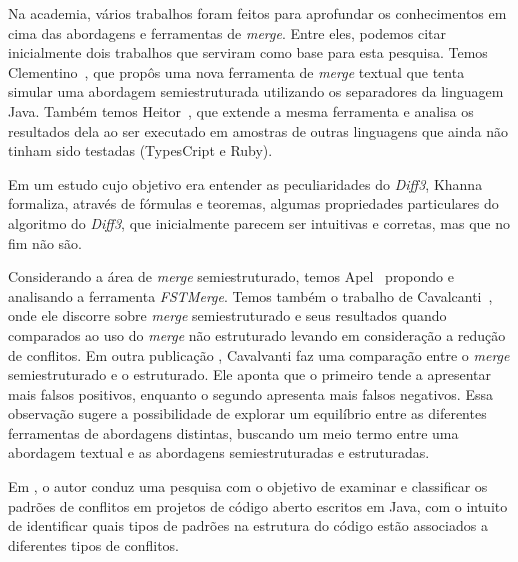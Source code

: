 Na academia, vários trabalhos foram feitos para aprofundar os conhecimentos em cima das abordagens e
ferramentas de \emph{merge}. Entre eles, podemos citar inicialmente dois trabalhos que serviram como base para esta pesquisa.
Temos Clementino~\cite{clem21}, que propôs uma nova ferramenta de \emph{merge} textual que tenta simular uma abordagem semiestruturada
utilizando os separadores da linguagem Java. Também temos Heitor~\cite{heitor21}, que extende a mesma ferramenta e analisa os
resultados dela ao ser executado em amostras de outras linguagens que ainda não tinham sido testadas (TypesCript e Ruby).

Em um estudo cujo objetivo era entender as peculiaridades do \emph{Diff3}, Khanna \cite{khan07} formaliza, através de fórmulas e teoremas,
algumas propriedades particulares do algoritmo do \emph{Diff3}, que inicialmente parecem ser intuitivas e corretas, mas que no fim não
são.

Considerando a área de \emph{merge} semiestruturado, temos Apel~\cite{apel11} propondo e analisando a ferramenta \emph{FSTMerge}. Temos
também o trabalho de Cavalcanti~\cite{cavalcanti17}, onde ele
discorre sobre \emph{merge} semiestruturado e seus resultados quando comparados ao uso do \emph{merge} não
estruturado levando em consideração a redução de conflitos.
Em outra publicação \cite{cavalcanti19}, Cavalvanti faz uma comparação entre o \emph{merge} semiestruturado e o estruturado.
Ele aponta que o primeiro tende a apresentar mais falsos positivos, enquanto o segundo apresenta mais falsos negativos.
Essa observação sugere a possibilidade de explorar um equilíbrio entre as diferentes ferramentas de abordagens
distintas, buscando um meio termo entre uma abordagem textual e as abordagens
semiestruturadas e estruturadas.

Em \cite{accioly18}, o autor conduz uma pesquisa com o objetivo de examinar e classificar os
padrões de conflitos em projetos de código aberto escritos em Java,
com o intuito de identificar quais tipos de padrões na estrutura do
código estão associados a diferentes tipos de conflitos.

